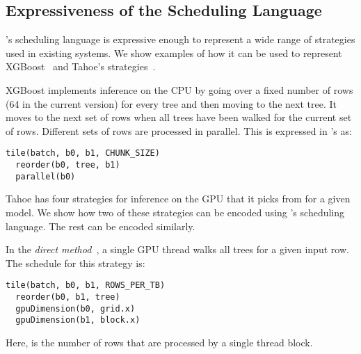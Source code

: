 
\subsection{Expressiveness of the Scheduling Language}
\Treebeard{}'s scheduling language is expressive enough to represent a wide range of
strategies used in existing systems. We show examples of how it can be used to 
represent XGBoost~\cite{XGBoost} and Tahoe's strategies~\cite{Tahoe}. 

XGBoost\cite{XGBoost} implements inference on the CPU by going 
over a fixed number of rows (64 in the current version)
for every tree and then moving to the next tree. It moves to the 
next set of rows when all trees have been walked for the current 
set of rows. Different sets of rows are processed in parallel.
This is expressed in \Treebeard{}'s as:
\begin{lstlisting}[style=c++]
  tile(batch, b0, b1, CHUNK_SIZE)
  reorder(b0, tree, b1)
  parallel(b0)
\end{lstlisting}

Tahoe\cite{Tahoe} has four strategies for inference on the GPU that it picks from for a given model. 
We show how two of these strategies can be encoded using \Treebeard{}'s scheduling language.
The rest can be encoded similarly. 

In the \emph{direct method}~\cite{Tahoe}, a single GPU thread walks all trees
for a given input row. The schedule for this strategy is:
\begin{lstlisting}[style=c++]
  tile(batch, b0, b1, ROWS_PER_TB)
  reorder(b0, b1, tree)
  gpuDimension(b0, grid.x)
  gpuDimension(b1, block.x)
\end{lstlisting}
Here,  is the number of rows that are processed by a single thread block.

